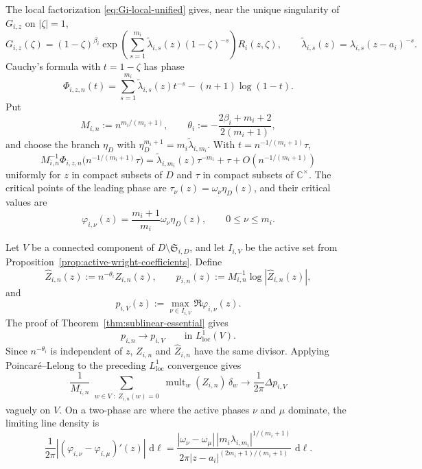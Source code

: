 \documentclass[reqno]{article}
\theoremstyle{definition}
\theoremstyle{remark}
\theoremstyle{plain}
\newcommand{\C}{\mathbb C}
\newcommand{\dd}{\,\mathrm d}
\begin{document}
The local factorization \eqref{eq:Gi-local-unified} gives, near the unique singularity of $G_{i,z}$ on $|\zeta|=1$,
\[
G_{i,z}(\zeta)=
(1-\zeta)^{\beta_i}
\exp\!\left(\sum_{s=1}^{m_i}\widetilde\lambda_{i,s}(z)(1-\zeta)^{-s}\right)R_i(z,\zeta),
\qquad
\widetilde\lambda_{i,s}(z)=\lambda_{i,s}(z-a_i)^{-s}.
\]
Cauchy's formula with $t=1-\zeta$ has phase
\[
\Phi_{i,z,n}(t)=\sum_{s=1}^{m_i}\widetilde\lambda_{i,s}(z)t^{-s}-(n+1)\log(1-t).
\]
Put
\[
M_{i,n}:=n^{m_i/(m_i+1)},
\qquad
\theta_i:=-\frac{2\beta_i+m_i+2}{2(m_i+1)},
\]
and choose the branch $\eta_D$ with $\eta_D^{m_i+1}=m_i\widetilde\lambda_{i,m_i}$. With $t=n^{-1/(m_i+1)}\tau$,
\[
M_{i,n}^{-1}\Phi_{i,z,n}\bigl(n^{-1/(m_i+1)}\tau\bigr)
=\widetilde\lambda_{i,m_i}(z)\tau^{-m_i}+\tau+O\!\left(n^{-1/(m_i+1)}\right)
\]
uniformly for $z$ in compact subsets of $D$ and $\tau$ in compact subsets of $\C^\times$. The critical points of the leading phase are $\tau_\nu(z)=\omega_\nu\eta_D(z)$, and their critical values are
\[
\varphi_{i,\nu}(z)=\frac{m_i+1}{m_i}\omega_\nu\eta_D(z),
\qquad 0\le\nu\le m_i.
\]

Let $V$ be a connected component of $D\setminus\mathfrak S_{i,D}$, and let $I_{i,V}$ be the active set from Proposition~\ref{prop:active-wright-coefficients}. Define
\[
\widehat Z_{i,n}(z):=n^{-\theta_i}Z_{i,n}(z),
\qquad
p_{i,n}(z):=M_{i,n}^{-1}\log|\widehat Z_{i,n}(z)|,
\]
and
\[
p_{i,V}(z):=\max_{\nu\in I_{i,V}}\Re\varphi_{i,\nu}(z).
\]
The proof of Theorem~\ref{thm:sublinear-essential} gives
\[
p_{i,n}\longrightarrow p_{i,V}
\qquad\text{in }L^1_{\mathrm{loc}}(V).
\]
Since $n^{-\theta_i}$ is independent of $z$, $Z_{i,n}$ and $\widehat Z_{i,n}$ have the same divisor. Applying Poincar\'e--Lelong to the preceding $L^1_{\mathrm{loc}}$ convergence gives
\begin{equation}\label{eq:essential-fisher-zero-convergence}
\frac1{M_{i,n}}
\sum_{\substack{w\in V\;:\; Z_{i,n}(w)=0}}
\operatorname{mult}_w(Z_{i,n})\,\delta_w
\longrightarrow
\frac{1}{2\pi}\Delta p_{i,V}
\end{equation}
vaguely on $V$. On a two-phase arc where the active phases $\nu$ and $\mu$ dominate, the limiting line density is
\[
\frac{1}{2\pi}|(\varphi_{i,\nu}-\varphi_{i,\mu})'(z)|\,\dd\ell
=
\frac{|\omega_\nu-\omega_\mu|\,|m_i\lambda_{i,m_i}|^{1/(m_i+1)}}{2\pi |z-a_i|^{(2m_i+1)/(m_i+1)}}\,\dd\ell .
\]
\end{document}
